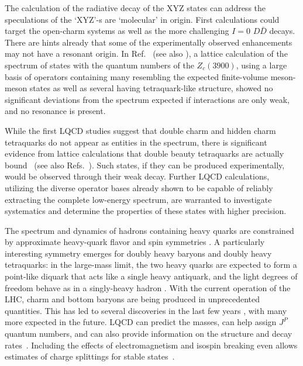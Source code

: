 
The calculation of the radiative decay of the XYZ states can address the speculations of the `XYZ'-s are `molecular' in origin. First calculations could target the open-charm systems as well as the more challenging $I=0$ $D\bar{D}$ decays.
%
There are hints already that some of the experimentally observed enhancements may not have a resonant origin. In Ref.~\cite{Cheung:2017tnt} (see also \cite{Prelovsek:2014swa}), a lattice calculation of the spectrum of states with the quantum numbers of the $Z_c(3900)$, using a large basis of operators containing many resembling the expected finite-volume meson-meson states as well as several having tetraquark-like structure, showed no significant deviations from the spectrum expected if interactions are only weak, and no resonance is present. 

While the first LQCD studies suggest that double charm and hidden charm tetraquarks do not appear as entities in the spectrum, there is significant evidence from lattice calculations that double beauty tetraquarks are actually {bound}~\cite{Francis:2016hui, Junnarkar:2018twb, Leskovec:2019ioa} (see also Refs.~\cite{Hughes:2017xie, Francis:2018jyb}). Such states, if they can be produced experimentally, would be observed through their weak decay. Further LQCD calculations, utilizing the diverse operator bases already shown to be capable of  reliably extracting the complete low-energy spectrum, are warranted to investigate systematics and determine the properties of these states with higher precision.

The spectrum and dynamics of hadrons containing heavy quarks are constrained by approximate heavy-quark flavor and spin symmetries
\cite{Korner:1994nh, Manohar:2000dt}. A particularly interesting symmetry emerges for doubly heavy baryons and doubly heavy tetraquarks: in the large-mass limit, the two heavy quarks
are expected to form a point-like diquark that acts like a single heavy antiquark, and the light degrees of freedom behave as in a
singly-heavy hadron \cite{Carlson:1987hh, Savage:1990di, Manohar:1992nd, Brambilla:2005yk, Eichten:2017ffp}. With the current operation of the LHC, charm and bottom baryons are being produced in unprecedented quantities.
This has led to several discoveries in the last few years \cite{Chatrchyan:2012ni, Aaij:2012da, Aaij:2014yka, Aaij:2016jnn, Aaij:2017ueg,  Aaij:2017vbw, Aaij:2017nav, Aaij:2018yqz, Aaij:2018tnn}, with many more expected in the future. LQCD
can predict the masses, can help assign $J^P$ quantum numbers, and can also provide information on the structure and decay rates~\cite{Brown:2014ena, Padmanath:2015jea, Bali:2015lka, Can:2015exa, Alexandrou:2016xok, Bahtiyar:2018vub, Woloshyn:2016pid, Alexandrou:2017xwd, Mathur:2018epb, Mathur:2018rwu}. Including the effects of electromagnetism and isospin breaking even allows estimates of charge splittings for stable states~\cite{Borsanyi:2014jba}.


